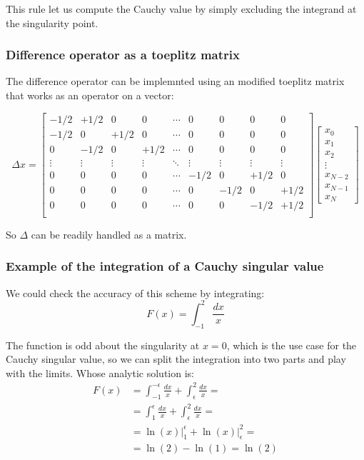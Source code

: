 This rule let us compute the Cauchy value by simply excluding the integrand at the singularity point.

\subsubsection{Difference operator as a toeplitz matrix}
The difference operator can be implemnted using an modified toeplitz matrix that works as an operator on a vector:

\begin{equation}
    \Delta x = 
    \begin{bmatrix}
        -1/2 & +1/2 & 0 & 0 &\cdots & 0 & 0 & 0 & 0\\
        -1/2 & 0 & +1/2 & 0 & \cdots & 0 & 0 & 0 & 0\\
        0 &-1/2 & 0 & +1/2 & \cdots & 0 & 0 & 0 & 0\\
        \vdots & \vdots & \vdots & \vdots & \ddots & \vdots & \vdots & \vdots & \vdots \\
        0 & 0 & 0 & 0 & \cdots & -1/2 & 0 & +1/2 & 0 \\
        0 & 0 & 0 & 0 & \cdots & 0 & -1/2 & 0 & +1/2 \\
        0 & 0 & 0 & 0 & \cdots & 0 & 0 & -1/2 & +1/2 \\
    \end{bmatrix}
    \begin{bmatrix}
        x_0 \\
        x_1 \\
        x_2 \\
        \vdots \\
        x_{N-2} \\
        x_{N-1} \\
        x_N
    \end{bmatrix}
\end{equation}

So $\Delta$ can be readily handled as a matrix.

\subsubsection{Example of the integration of a Cauchy singular value}
We could check the accuracy of this scheme by integrating:
\begin{equation}
    F(x) = \int_{-1}^{2}\frac{dx}{x}
\end{equation}

The function is odd about the singularity at $x=0$, which is the use case for the Cauchy singular value, so we can split the integration into two parts and play with the limits.
Whose analytic solution is:
\begin{align}
    F(x)    &= \int_{-1}^{-\epsilon} \frac{dx}{x} + \int_{\epsilon}^{2} \frac{dx}{x} = \\
            &= \int_{1}^{\epsilon} \frac{dx}{x} + \int_{\epsilon}^{2} \frac{dx}{x} = \\
            &= \left. \ln(x) \right|_{1}^{\epsilon} + \left. \ln(x) \right|_{\epsilon}^{2} = \\
            &= \ln(2) - \ln(1) = \ln (2)
\end{align}

